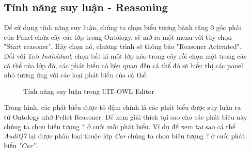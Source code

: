 \subsection{Tính năng suy luận - Reasoning}
Để sử dụng tính năng suy luận, chúng ta chọn biểu tượng bánh răng ở góc phải của Panel chứa cây các lớp trong Ontology, sẽ mở ra một menu với tùy chọn "Start reasoner". Hãy chọn nó, chương trình sẽ thông báo "Reasoner Activated". Đối với Tab \textit{Individual}, chọn bất kì một lớp nào trong cây rồi chọn một trong các cá thể của lớp đó, các phát biểu có liên quan đến cá thể đó sẽ hiển thị các panel nhỏ tương ứng với các loại phát biểu của cá thể.
\begin{figure}[h!]
	\centering
	\caption{Tính năng suy luận trong UIT-OWL Editor\label{overflow}}
\end{figure}
Trong hình, các phát biểu được tô đậm chính là các phát biểu được suy luận ra từ Ontology nhờ Pellet Reasoner. Để xem giải thích tại sao cho các phát biểu này chúng ta chọn biểu tượng ? ở cuối mỗi phát biểu. Ví dụ để xem tại sao cá thể \textit{AudiQ7} lại được phân loại thuộc lớp \textit{Car} chúng ta chọn biểu tượng ? ở cuối phát biểu \textit{"Car"}.
